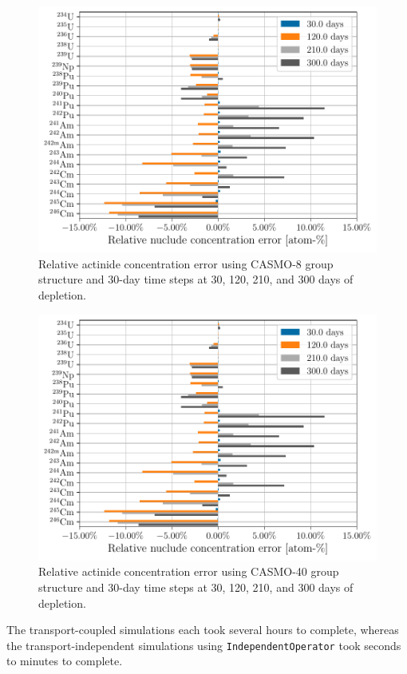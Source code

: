     \begin{figure}[h!tpb]
        \centering
        \includegraphics[width=\linewidth]{figs/actinides_casmo8_constant_xs_predictor_fission_q_months.pdf}
        \caption[]{Relative actinide concentration error using
        CASMO-8 group structure and 30-day time steps at 30, 120, 210, and 300
    days of depletion.}
        \label{fig:actinides-error-casmo8-xs-months}
    \end{figure}

    \begin{figure}[h!tpb]
        \centering
        \includegraphics[width=\linewidth]{figs/actinides_casmo40_constant_xs_predictor_fission_q_months.pdf}
        \caption{Relative actinide concentration error using
        CASMO-40 group structure and 30-day time steps at 30, 120, 210, and 300
    days of depletion.}
        \label{fig:actinides-error-casmo40-xs-months}
    \end{figure}


    The transport-coupled simulations each took several hours to complete,
    whereas the transport-independent simulations using
    \verb.IndependentOperator. took seconds to minutes to complete.
